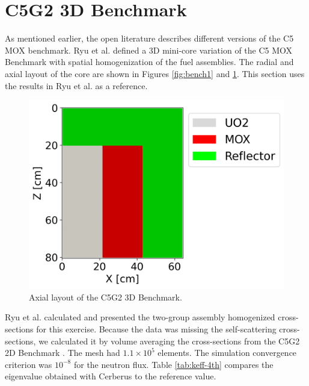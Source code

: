\documentclass{anstrans}
\begin{document}


\section{C5G2 3D Benchmark}

As mentioned earlier, the open literature describes different versions of the C5 MOX benchmark.
Ryu et al. \cite{ryu_finite_2013} defined a 3D mini-core variation of the C5 MOX Benchmark with spatial homogenization of the fuel assemblies.
The radial and axial layout of the core are shown in Figures \ref{fig:bench1} and \ref{fig:c5g2-3d}.
This section uses the results in Ryu et al. as a reference.


\begin{figure}[h] %
    \centering
    \includegraphics[width=0.77\linewidth]{figures/geo-xz2.png}
    \hfill
    \caption{Axial layout of the C5G2 3D Benchmark.}
    \label{fig:c5g2-3d}
\end{figure}

Ryu et al. calculated and presented the two-group assembly homogenized cross-sections for this exercise.
Because the data was missing the self-scattering cross-sections, we calculated it by volume averaging the cross-sections from the C5G2 2D Benchmark \cite{cavarec_benchmark_1994}.
The mesh had $1.1 \times 10^{5}$ elements.
The simulation convergence criterion was $10^{-8}$ for the neutron flux.
Table \ref{tab:keff-4th} compares the eigenvalue obtained with Cerberus to the reference value.
\end{document}
